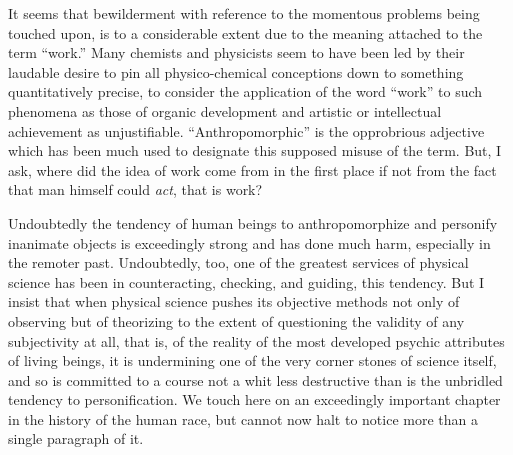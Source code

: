 \documentclass[a4paper, 11pt, oneside, polutonikogreek, english]{article}
\begin{document}
It seems that bewilderment with reference to the momentous problems being touched upon, is to a considerable extent due to the meaning attached to the term ``work.'' Many chemists and physicists seem to have been led by their laudable desire to pin all physico-chemical conceptions down to something quantitatively precise, to consider the application of the word ``work'' to such phenomena as those of organic development and artistic or intellectual achievement as unjustifiable. ``Anthropomorphic'' is the opprobrious adjective which has been much used to designate this supposed misuse of the term. But, I ask, where did the idea of work come from in the first place if not from the fact that man himself could \emph{act}, that is work?

Undoubtedly the tendency of human beings to anthropomorphize and personify inanimate objects is exceedingly strong and has done much harm, especially in the remoter past. Undoubtedly, too, one of the greatest services of physical science has been in counteracting, checking, and guiding, this tendency. But I insist that when physical science pushes its objective methods not only of observing but of theorizing to the extent of questioning the validity of any subjectivity at all, that is, of the reality of the most developed psychic attributes of living beings, it is undermining one of the very corner stones of science itself, and so is committed to a course not a whit less destructive than is the unbridled tendency to personification. We touch here on an exceedingly important chapter in the history of the human race, but cannot now halt to notice more than a single paragraph of it.
\end{document}
